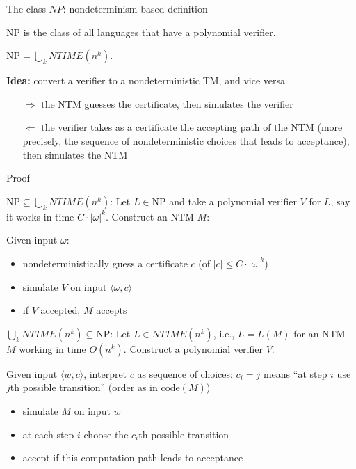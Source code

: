 \documentclass[handout]{beamer}
\begin{document}
\begin{frame}{The class $NP$: nondeterminism-based definition}
    
    \begin{definition}
        $\mathrm{NP}$ is the class of all languages that have a polynomial verifier.
    \end{definition}
    \begin{theorem}
    $\mathrm{NP}=\bigcup_k NTIME(n^k)$.
    \end{theorem}

    \textbf{Idea:} convert a verifier to a nondeterministic TM, and vice versa
    \begin{itemize}
        \item[$\Rightarrow$] the NTM guesses the certificate, then simulates the verifier
        \item[$\Leftarrow$] the verifier takes as a certificate the accepting path of the NTM (more precisely, the sequence of nondeterministic choices that leads to acceptance), then simulates the NTM
    \end{itemize}

\end{frame}
    
\begin{frame}{Proof}
    
    \alert{$\mathrm{NP}\subseteq\bigcup_k NTIME(n^k)$:} Let $L\in\mathrm{NP}$ and take a polynomial verifier $V$ for $L$, say it works in time $C\cdot |\omega|^k$. Construct an NTM $M$:

    Given input $\omega$:
    
    \vspace{-3pt}
    \begin{itemize}
        \item nondeterministically guess a certificate $c$ (of $|c|\leq C\cdot |\omega|^k$)
        \item simulate $V$ on input $\langle \omega, c\rangle$
        \item if $V$ accepted, $M$ accepts
    \end{itemize}
        
    \alert{$\bigcup_k NTIME(n^k)\subseteq\mathrm{NP}$:} Let $L\in NTIME(n^k)$, i.e., $L=L(M)$ for an NTM $M$ working in time $O(n^k)$. Construct a polynomial verifier $V$:

    Given input $\langle w, c\rangle$, interpret $c$ as sequence of choices: $c_i=j$ means ``at step $i$ use $j$th possible transition'' (order as in $\mathrm{code}(M)$)
 
    \vspace{-3pt}
    \begin{itemize}        
        \item simulate $M$ on input $w$
        \item at each step $i$ choose the $c_i$th possible transition
        \item accept if this computation path leads to acceptance\hfill\qedsymbol     
    \end{itemize}    

\end{frame}
\end{document}
